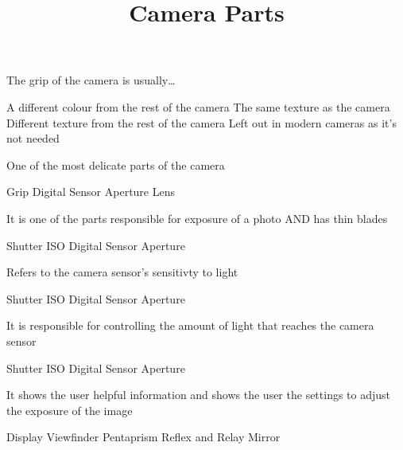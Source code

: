 \documentclass[theme=sleek, randomorder, hidesidemenu]{webquiz}
\title{Camera Parts}
\begin{document}
\begin{question}
  The grip of the camera is usually\dots
  \begin{choice}[columns=2]
    \incorrect A different colour from the rest of the camera
    \incorrect The same texture as the camera
    \correct  Different texture from the rest of the camera
    \incorrect Left out in modern cameras as it's not needed
  \end{choice}
\end{question}

\begin{question}
 One of the most delicate parts of the camera
  \begin{choice}[columns=2]
    \incorrect Grip
    \correct   Digital Sensor
    \incorrect Aperture
    \incorrect Lens
  \end{choice}
\end{question}

\begin{question}
  It is one of the parts responsible for exposure of a photo AND has thin blades
  \begin{choice}[columns=2]
    \incorrect Shutter
    \incorrect ISO
    \incorrect Digital Sensor
    \correct Aperture
  \end{choice}
\end{question}

\begin{question}
 Refers to the camera sensor's sensitivty to light
  \begin{choice}[columns=2]
    \incorrect Shutter
    \correct ISO
    \incorrect Digital Sensor
    \incorrect Aperture
  \end{choice}
\end{question}

\begin{question}
  It is responsible for controlling the amount of light that reaches the camera sensor
  \begin{choice}[columns=2]
    \correct Shutter
    \incorrect ISO
    \incorrect Digital Sensor
    \incorrect Aperture
  \end{choice}
\end{question}

\begin{question}
  It shows the user helpful information and shows the user the settings to adjust the exposure of the image
  \begin{choice}[columns=2]
    \correct Display
    \incorrect Viewfinder
    \incorrect Pentaprism
    \incorrect Reflex and Relay Mirror
  \end{choice}
\end{question}
\end{document}
